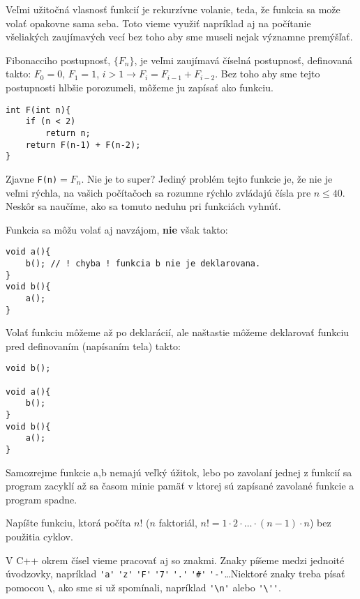 \medskip

Veľmi užitočná vlasnosť funkcií je rekurzívne volanie, teda, že funkcia sa može
volať opakovne sama seba. Toto vieme využiť napríklad aj na počítanie
všeliakých zaujímavých vecí bez toho aby sme museli nejak významne
premýšľať.

Fibonacciho postupnosť, $\{F_n\}$,  je veľmi zaujímavá číselná postupnosť,
definovaná takto: $F_0 = 0$, $F_1 = 1$, $i>1 \rightarrow F_i = F_{i-1} +
F_{i-2}$.  Bez toho aby sme tejto postupnosti hlbšie porozumeli, môžeme ju
zapísať ako funkciu.

\begin{lstlisting}
int F(int n){
    if (n < 2)
        return n;
    return F(n-1) + F(n-2);
}
\end{lstlisting}

Zjavne \verb!F(n)!$ = F_n$. Nie je to super? Jediný problém tejto funkcie je,
že nie je veľmi rýchla, na vašich počítačoch sa rozumne rýchlo zvládajú čísla
pre $n \leq 40$. Neskôr sa naučíme, ako sa tomuto neduhu pri funkciách vyhnúť.

\medskip

Funkcia sa môžu volať aj navzájom, \textbf{nie} však takto:
\begin{lstlisting}
void a(){
    b(); // ! chyba ! funkcia b nie je deklarovana.
}
void b(){
    a();
}
\end{lstlisting}

Volať funkciu môžeme až po deklarácií, ale naštastie môžeme deklarovať
funkciu pred definovaním (napísaním tela) takto:

\begin{lstlisting}
void b();

void a(){
    b();
}
void b(){
    a();
}
\end{lstlisting}

Samozrejme funkcie a,b nemajú veľký úžitok, lebo po zavolaní jednej z funkcií
sa program zacyklí až sa časom minie pamäť v ktorej sú zapísané zavolané
funkcie a program spadne.

\cvicenie Napíšte funkciu, ktorá počíta $n!$ ($n$ faktoriál, $n! = 1\cdot
2\cdot\dots\cdot (n-1)\cdot n$) bez použitia cyklov.


V C++ okrem čísel vieme pracovať aj so znakmi. Znaky píšeme medzi jednoité
úvodzovky, napríklad \verb!'a'! \verb!'z'! \verb!'F'! \verb!'7'! \verb!'.'!
\verb!'#'! \verb!'-'!\dots Niektoré znaky treba písať pomocou \verb'\', ako sme
si už spomínali, napríklad \verb!'\n'! alebo \verb!'\''!.

